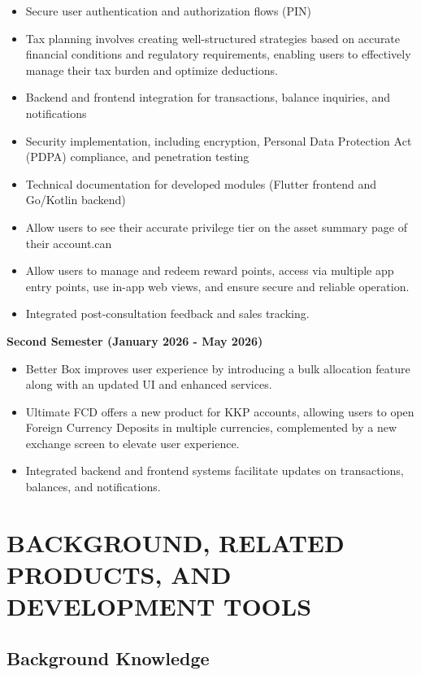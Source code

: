 \documentclass[12pt,oneside,openright,a4paper]{cpe-english-project}
\begin{document}
\begin{itemize}
  \item
    Secure user authentication and authorization flows (PIN)
  \item
    Tax planning involves creating well-structured strategies based on
    accurate financial conditions and regulatory requirements, enabling
    users to effectively manage their tax burden and optimize
    deductions.
  \item
    Backend and frontend integration for transactions, balance
    inquiries, and notifications
  \item
    Security implementation, including encryption, Personal Data
    Protection Act (PDPA) compliance, and penetration testing
  \item
    Technical documentation for developed modules (Flutter frontend and
    Go/Kotlin backend)
  \item
    Allow users to see their accurate privilege tier on the asset
    summary page of their account.can
  \item
    Allow users to manage and redeem reward points, access via multiple
    app entry points, use in-app web views, and ensure secure and
    reliable operation.
  \item
    Integrated post-consultation feedback and sales tracking.
\end{itemize}

\textbf{Second Semester (January 2026 -
May
2026)}

\begin{itemize}
\item
  Better Box improves user experience by introducing a bulk allocation
  feature along with an updated UI and enhanced services.
\item
  Ultimate FCD offers a new product for KKP accounts, allowing users to
  open Foreign Currency Deposits in multiple currencies, complemented by
  a new exchange screen to elevate user experience.
\item
  Integrated backend and frontend systems facilitate updates on
  transactions, balances, and notifications.
\end{itemize}

\chapter{BACKGROUND, RELATED PRODUCTS, AND DEVELOPMENT TOOLS}

\section{Background Knowledge}
\end{document}
